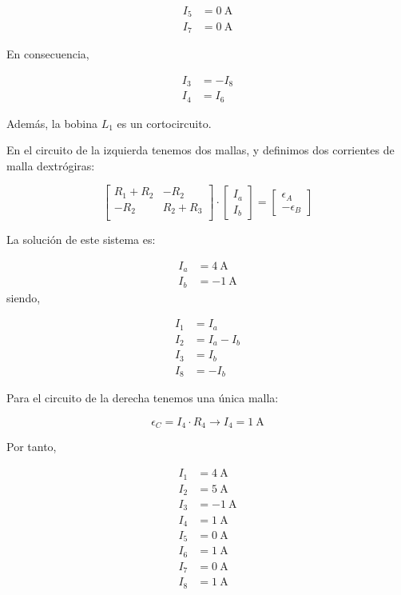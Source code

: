 \documentclass[10pt]{article}
\begin{document}
\begin{align*}
  I_5 &= \SI{0}{\ampere}\\
  I_7 &= \SI{0}{\ampere}
\end{align*}

En consecuencia,

\begin{align*}
  I_3 &= -I_8\\
  I_4 &= I_6
\end{align*}

Además, la bobina $L_1$ es un cortocircuito.

En el circuito de la izquierda tenemos dos mallas, y definimos dos corrientes de malla dextrógiras:

\begin{equation*}
  \begin{bmatrix}
    R_1 + R_2 & -R_2\\
    -R_2 & R_2 + R_3\\
  \end{bmatrix} \cdot %
  \begin{bmatrix}
    I_a\\
    I_b
  \end{bmatrix} = %
  \begin{bmatrix}
    \epsilon_A\\
    -\epsilon_B
  \end{bmatrix}
\end{equation*}

La solución de este sistema es:

\begin{align*}
  I_a &= \SI{4}{\ampere}\\
  I_b &= \SI{-1}{\ampere}
\end{align*}
siendo,

\begin{align*}
  I_1 &= I_a\\
  I_2 &= I_a - I_b\\
  I_3 &= I_b\\
  I_8 &= -I_b
\end{align*}

Para el circuito de la derecha tenemos una única malla:

\begin{equation*}
  \epsilon_C = I_4 \cdot R_4 \rightarrow I_4 = \SI{1}{\ampere}
\end{equation*}

Por tanto,

\begin{align*}
  I_1 &= \SI{4}{\ampere}\\
  I_2 &= \SI{5}{\ampere}\\
  I_3 &= \SI{-1}{\ampere}\\
  I_4 &= \SI{1}{\ampere}\\
  I_5 &= \SI{0}{\ampere}\\
  I_6 &= \SI{1}{\ampere}\\
  I_7 &= \SI{0}{\ampere}\\
  I_8 &= \SI{1}{\ampere}\\
\end{align*}
\end{document}
